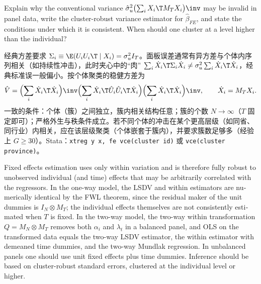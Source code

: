 \begin{prac}\label{pr:U10b-cluster}
Explain why the conventional variance $\hat\sigma_u^2\bigl(\sum_iX_i\T M_TX_i\bigr)\inv$ may be invalid in panel data, write the cluster-robust variance estimator for $\hat\beta_{FE}$, and state the conditions under which it is consistent. When should one cluster at a level higher than the individual?

\answer 经典方差要求 $\Sigma_i\equiv\E(U_iU_i\T\mid X_i)=\sigma_u^2I_T$。面板误差通常有异方差与个体内序列相关（如持续性冲击），此时夹心中的“肉” $\sum_i\dot X_i\T\Sigma_i\dot X_i\neq\sigma_u^2\sum_i\dot X_i\T\dot X_i$，经典标准误一般偏小。按个体聚类的稳健方差为
\[
\hat V=\Bigl(\sum_i\dot X_i\T\dot X_i\Bigr)\inv\Bigl(\sum_i\dot X_i\T\hat U_i\hat U_i\T\dot X_i\Bigr)\Bigl(\sum_i\dot X_i\T\dot X_i\Bigr)\inv,\qquad \dot X_i=M_TX_i.
\]
一致的条件：个体（簇）之间独立，簇内相关结构任意；簇的个数 $N\to\infty$（$T$ 固定即可）；严格外生与秩条件成立。若不同个体的冲击在某个更高层级（如同省、同行业）内相关，应在该层级聚类（个体嵌套于簇内），并要求簇数足够多（经验上 $G\ge30$）。Stata：\texttt{xtreg y x, fe vce(cluster id)} 或 \texttt{vce(cluster province)}。
\end{prac}

\begin{english}
Fixed effects estimation uses only within variation and is therefore fully robust to unobserved individual (and time) effects that may be arbitrarily correlated with the regressors. In the one-way model, the LSDV and within estimators are numerically identical by the FWL theorem, since the residual maker of the unit dummies is $I_N\otimes M_T$; the individual effects themselves are not consistently estimated when $T$ is fixed. In the two-way model, the two-way within transformation $Q=M_N\otimes M_T$ removes both $\alpha_i$ and $\lambda_t$ in a balanced panel, and OLS on the transformed data equals the two-way LSDV estimator, the within estimator with demeaned time dummies, and the two-way Mundlak regression. In unbalanced panels one should use unit fixed effects plus time dummies. Inference should be based on cluster-robust standard errors, clustered at the individual level or higher.
\end{english}
